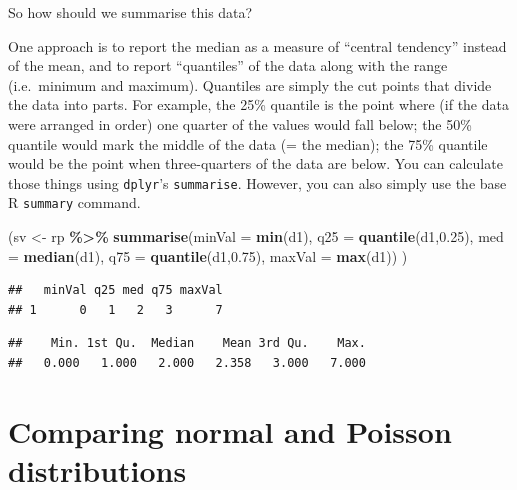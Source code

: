 \documentclass[
  a4paperpaper,
]{book}
\newenvironment{Shaded}{\begin{snugshade}}{\end{snugshade}}
\newcommand{\CommentTok}[1]{\textcolor[rgb]{0.56,0.35,0.01}{\textit{#1}}}
\newcommand{\DataTypeTok}[1]{\textcolor[rgb]{0.13,0.29,0.53}{#1}}
\newcommand{\FloatTok}[1]{\textcolor[rgb]{0.00,0.00,0.81}{#1}}
\newcommand{\KeywordTok}[1]{\textcolor[rgb]{0.13,0.29,0.53}{\textbf{#1}}}
\newcommand{\NormalTok}[1]{#1}
\newcommand{\OperatorTok}[1]{\textcolor[rgb]{0.81,0.36,0.00}{\textbf{#1}}}
\newcommand{\StringTok}[1]{\textcolor[rgb]{0.31,0.60,0.02}{#1}}
\begin{document}
So how should we summarise this data?

One approach is to report the median as a measure of ``central tendency'' instead of the mean, and to report ``quantiles'' of the data along with the range (i.e.~minimum and maximum). Quantiles are simply the cut points that divide the data into parts. For example, the 25\% quantile is the point where (if the data were arranged in order) one quarter of the values would fall below; the 50\% quantile would mark the middle of the data (= the median); the 75\% quantile would be the point when three-quarters of the data are below. You can calculate those things using \texttt{dplyr}'s \texttt{summarise}. However, you can also simply use the base R \texttt{summary} command.

\begin{Shaded}
\begin{Highlighting}[]
\NormalTok{(sv \textless{}{-}}\StringTok{ }\NormalTok{rp }\OperatorTok{\%\textgreater{}\%}\StringTok{ }
\StringTok{  }\KeywordTok{summarise}\NormalTok{(}\DataTypeTok{minVal =} \KeywordTok{min}\NormalTok{(d1),}
            \DataTypeTok{q25 =} \KeywordTok{quantile}\NormalTok{(d1,}\FloatTok{0.25}\NormalTok{),}
            \DataTypeTok{med =} \KeywordTok{median}\NormalTok{(d1),}
            \DataTypeTok{q75 =} \KeywordTok{quantile}\NormalTok{(d1,}\FloatTok{0.75}\NormalTok{),}
            \DataTypeTok{maxVal =} \KeywordTok{max}\NormalTok{(d1))}
\NormalTok{ )}
\end{Highlighting}
\end{Shaded}

\begin{verbatim}
##   minVal q25 med q75 maxVal
## 1      0   1   2   3      7
\end{verbatim}

\begin{Shaded}
\end{Shaded}

\begin{verbatim}
##    Min. 1st Qu.  Median    Mean 3rd Qu.    Max. 
##   0.000   1.000   2.000   2.358   3.000   7.000
\end{verbatim}

\hypertarget{comparing-normal-and-poisson-distributions}{%
\section{Comparing normal and Poisson distributions}\label{comparing-normal-and-poisson-distributions}}
\end{document}

